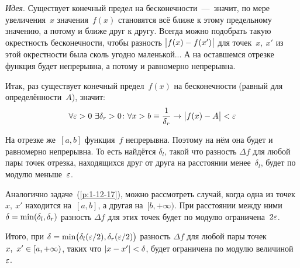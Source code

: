 \documentclass[a4paper,12pt]{article}
\begin{document}
  \begin{solution}
    \emph{Идея}.
    Существует конечный предел на бесконечности~---~значит, по мере увеличения~$x$ значения~$f(x)$ становятся всё ближе к этому предельному значению, а потому и ближе друг к другу.  %
    Всегда можно подобрать такую окрестность бесконечности, чтобы разность $\bigl|f(x) \hm- f(x')\bigr|$ для точек~$x,\ x'$ из этой окрестности была сколь угодно маленькой...
    А на оставшемся отрезке функция будет непрерывна, а потому и равномерно непрерывна.

    Итак, раз существует конечный предел~$f(x)$ на бесконечности (равный для определённости~$A$), значит:
    \[
      \forall \eps > 0\ \exists \delta_r > 0\colon \forall x > b \equiv \frac{1}{\delta_r} \to \bigl|f(x) - A\bigr| \hm< \eps
    \]

    На отрезке же~$[a, b]$ функция~$f$ непрерывна.
    Поэтому на нём она будет и равномерно непрерывна.  %
    То есть найдётся $\delta_l$, такой что разность $\Delta f$ для любой пары точек отрезка, находящихся друг от друга на расстоянии менее~$\delta_l$, будет по модулю меньше~$\varepsilon$.

    Аналогично задаче~(\ref{p:1-12-17}), можно рассмотреть случай, когда одна из точек~$x,\ x'$ находится на~$[a, b]$, а другая на~$[b, +\infty)$.
    При расстоянии между ними $\delta \hm= \min(\delta_l, \delta_r)$ разность $\Delta f$ для этих точек будет по модулю ограничена~$2 \varepsilon$.

    Итого, при $\delta \hm= \min\bigl(\delta_l(\eps/2), \delta_r(\eps/2)\bigr)$ разность $\Delta f$ для любой пары точек~$x,\ x' \hm\in [a, +\infty)$, таких что $|x \hm- x'| \hm< \delta$, будет ограничена по модулю величиной~$\varepsilon$.
  \end{solution}



  
  
  
\end{document}
